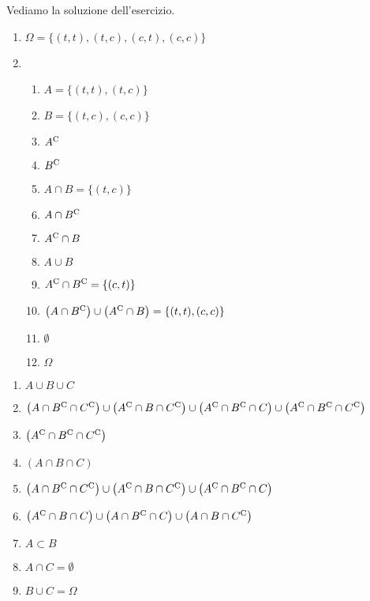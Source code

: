 Vediamo la soluzione dell'esercizio.
\begin{enumerate}
	\item $\Omega =\{(t,t) ,(t,c) ,(c,t) ,(c,c)\}$
	\item
	\begin{enumerate}
		\item $A=\{(t,t) ,(t,c)\}$
		\item $B=\{(t,c) ,(c,c)\}$
		\item $A^{\mathrm{C}}$
		\item $B^{\mathrm{C}}$
		\item $A\cap B=\{(t,c)\}$
		\item $A\cap B^{\mathrm{C}}$
		\item $A^{\mathrm{C}} \cap B$
		\item $A\cup B$
		\item $A^{\mathrm{C}} \cap B^{\mathrm{C}} =\{(c,t)\}$
		\item $\left(A\cap B^{\mathrm{C}}\right) \cup \left(A^{\mathrm{C}} \cap B\right) =\{(t,t) ,(c,c)\}$
		\item $\emptyset $
		\item $\Omega $
	\end{enumerate}
\end{enumerate}

\Soluzione

\begin{enumerate}
	\item $A\cup B\cup C$
	\item $\left(A\cap B^{\mathrm{C}} \cap C^{\mathrm{C}}\right) \cup \left(A^{\mathrm{C}} \cap B\cap C^{\mathrm{C}}\right) \cup \left(A^{\mathrm{C}} \cap B^{\mathrm{C}} \cap C\right) \cup \left(A^{\mathrm{C}} \cap B^{\mathrm{C}} \cap C^{\mathrm{C}}\right)$
	\item $\left(A^{\mathrm{C}} \cap B^{\mathrm{C}} \cap C^{\mathrm{C}}\right)$
	\item $(A\cap B\cap C)$
	\item $\left(A\cap B^{\mathrm{C}} \cap C^{\mathrm{C}}\right) \cup \left(A^{\mathrm{C}} \cap B\cap C^{\mathrm{C}}\right) \cup \left(A^{\mathrm{C}} \cap B^{\mathrm{C}} \cap C\right)$
	\item $\left(A^{\mathrm{C}} \cap B\cap C\right) \cup \left(A\cap B^{\mathrm{C}} \cap C\right) \cup \left(A\cap B\cap C^{\mathrm{C}}\right)$
	\item $A\subset B$
	\item $A\cap C=\emptyset $
	\item $B\cup C=\Omega $
\end{enumerate}

